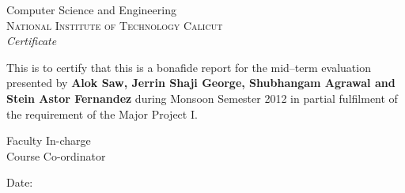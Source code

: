 \newpage
\thispagestyle{empty}

\begin{center}

\huge{Computer Science and Engineering}\\
\normalsize
\textsc{National Institute of Technology Calicut}\\[2.0cm]

\emph{\LARGE Certificate}\\[2.5cm]
\end{center}
\normalsize This is to certify that this is a bonafide report for the mid--term evaluation presented by \textbf{Alok Saw, Jerrin Shaji George, Shubhangam Agrawal and Stein Astor Fernandez} during Monsoon Semester 2012 in partial fulfilment of the requirement of the Major Project I.\\[1.0cm]

\vfill

\begin{flushright}
Faculty In-charge\\[1.5cm]
Course Co-ordinator\\[1.0cm]
\end{flushright}

\begin{flushleft}
Date:
\end{flushleft}
